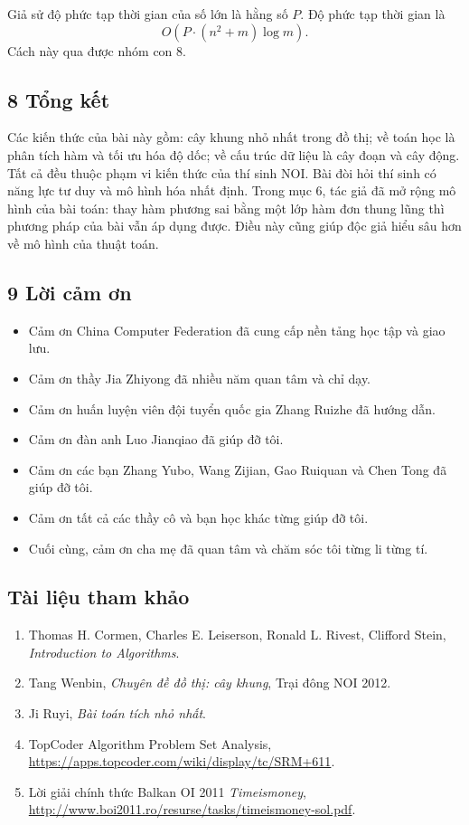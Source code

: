 \documentclass[11pt]{article}
\begin{document}
Giả sử độ phức tạp thời gian của số lớn là hằng số \(P\). Độ phức tạp thời gian
là
\[
  O(P\cdot(n^2+m)\log m).
\]
Cách này qua được nhóm con 8.

\subsection*{8 Tổng kết}

Các kiến thức của bài này gồm: cây khung nhỏ nhất trong đồ thị; về toán học là
phân tích hàm và tối ưu hóa độ dốc; về cấu trúc dữ liệu là cây đoạn và cây
động. Tất cả đều thuộc phạm vi kiến thức của thí sinh NOI. Bài đòi hỏi thí sinh
có năng lực tư duy và mô hình hóa nhất định. Trong mục 6, tác giả đã mở rộng mô
hình của bài toán: thay hàm phương sai bằng một lớp hàm đơn thung lũng thì
phương pháp của bài vẫn áp dụng được. Điều này cũng giúp độc giả hiểu sâu hơn
về mô hình của thuật toán.

\subsection*{9 Lời cảm ơn}

\begin{itemize}
  \item Cảm ơn China Computer Federation đã cung cấp nền tảng học tập và giao
  lưu.
  \item Cảm ơn thầy Jia Zhiyong đã nhiều năm quan tâm và chỉ dạy.
  \item Cảm ơn huấn luyện viên đội tuyển quốc gia Zhang Ruizhe đã hướng dẫn.
  \item Cảm ơn đàn anh Luo Jianqiao đã giúp đỡ tôi.
  \item Cảm ơn các bạn Zhang Yubo, Wang Zijian, Gao Ruiquan và Chen Tong đã
  giúp đỡ tôi.
  \item Cảm ơn tất cả các thầy cô và bạn học khác từng giúp đỡ tôi.
  \item Cuối cùng, cảm ơn cha mẹ đã quan tâm và chăm sóc tôi từng li từng tí.
\end{itemize}

\subsection*{Tài liệu tham khảo}

\begin{enumerate}
  \item Thomas H. Cormen, Charles E. Leiserson, Ronald L. Rivest, Clifford
  Stein, \emph{Introduction to Algorithms}.
  \item Tang Wenbin, \emph{Chuyên đề đồ thị: cây khung}, Trại đông NOI 2012.
  \item Ji Ruyi, \emph{Bài toán tích nhỏ nhất}.
  \item TopCoder Algorithm Problem Set Analysis,
  \url{https://apps.topcoder.com/wiki/display/tc/SRM+611}.
  \item Lời giải chính thức Balkan OI 2011 \emph{Timeismoney},
  \url{http://www.boi2011.ro/resurse/tasks/timeismoney-sol.pdf}.
\end{enumerate}
\end{document}
